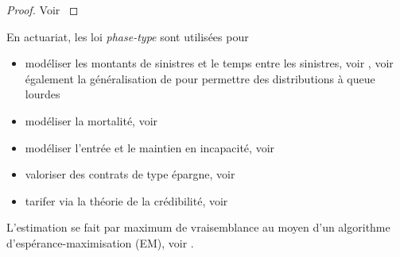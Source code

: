 \begin{proof}
Voir \citet[Chapitre 9, Section 1]{Asmussen2010}
\end{proof}
En actuariat, les loi \textit{phase-type} sont utilisées pour
\begin{itemize}
    \item modéliser les montants de sinistres et le temps entre les sinistres, voir \citet{Bladt2005}, voir également la généralisation de \citet{Albrecher2019} pour permettre des distributions à queue lourdes
    \item modéliser la mortalité, voir \citet{Lin2007}
    \item modéliser l'entrée et le maintien en incapacité, voir \citet{Zadeh2013}
    \item valoriser des contrats de type épargne, voir\citet{Asmussen2019}
    \item tarifer via la théorie de la crédibilité, voir \citet{Zadeh2014}
\end{itemize}
L'estimation se fait par maximum de vraisemblance au moyen d'un algorithme d'espérance-maximisation (EM), voir \citet{Asmussen1996}. 
